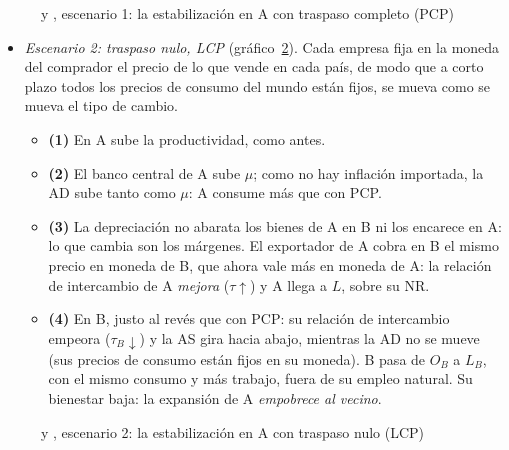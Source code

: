 \documentclass[11pt]{article}
\begin{document}
\begin{figure}[H]
\centering
\caption{ y , escenario 1: la estabilización en A con traspaso completo (PCP)}\label{fig:cp-pcp}
\end{figure}

\begin{itemize}
\item \emph{Escenario 2: traspaso nulo, LCP} (gráfico~\ref{fig:cp-lcp}). Cada empresa fija en la moneda del comprador el precio de lo que vende en cada país, de modo que a corto plazo todos los precios de consumo del mundo están fijos, se mueva como se mueva el tipo de cambio.
  \begin{itemize}
  \item \textbf{(1)} En A sube la productividad, como antes.
  \item \textbf{(2)} El banco central de A sube $\mu$; como no hay inflación importada, la AD sube tanto como $\mu$: A consume más que con PCP.
  \item \textbf{(3)} La depreciación no abarata los bienes de A en B ni los encarece en A: lo que cambia son los márgenes. El exportador de A cobra en B el mismo precio en moneda de B, que ahora vale más en moneda de A: la relación de intercambio de A \emph{mejora} ($\tau\uparrow$) y A llega a $L$, sobre su NR.
  \item \textbf{(4)} En B, justo al revés que con PCP: su relación de intercambio empeora ($\tau_B\downarrow$) y la AS gira hacia abajo, mientras la AD no se mueve (sus precios de consumo están fijos en su moneda). B pasa de $O_B$ a $L_B$, con el mismo consumo y más trabajo, fuera de su empleo natural. Su bienestar baja: la expansión de A \emph{empobrece al vecino}.
  \end{itemize}
\end{itemize}

\begin{figure}[H]
\centering
\caption{ y , escenario 2: la estabilización en A con traspaso nulo (LCP)}\label{fig:cp-lcp}
\end{figure}
\end{document}
